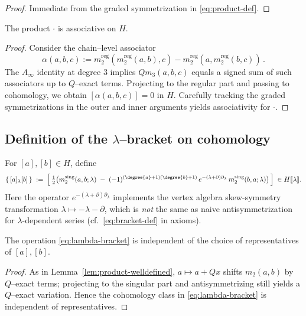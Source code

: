 \begin{proof}
Immediate from the graded symmetrization in \eqref{eq:product-def}.
\end{proof}

\begin{proposition}[Associativity on $H$]%
The product $\cdot$ is associative on $H$.
\end{proposition}

\begin{proof}
Consider the chain–level associator
\[
\alpha(a,b,c) := m_2^{\mathrm{reg}}(m_2^{\mathrm{reg}}(a,b),c) - m_2^{\mathrm{reg}}(a, m_2^{\mathrm{reg}}(b,c))\, .
\]
The $A_\infty$ identity at degree $3$ implies $Qm_3(a,b,c)$ equals a signed sum of such associators up to $Q$–exact terms. Projecting to the regular part and passing to cohomology, we obtain $[\alpha(a,b,c)]=0$ in $H$. Carefully tracking the graded symmetrizations in the outer and inner arguments yields associativity for $\cdot$.
\end{proof}
\subsection{Definition of the $\lambda$–bracket on cohomology}
\begin{definition}%
For $[a],[b]\in H$, define
\begin{equation}%
\{\, [a] {}_\lambda [b] \,\} \;:=\; \Big[\, \tfrac{1}{2}\big( m_2^{\mathrm{sing}}(a,b;\lambda) \;-\; (-1)^{(\degree{a}+1)(\degree{b}+1)}\, e^{-(\lambda+\partial)\partial_\lambda}\, m_2^{\mathrm{sing}}(b,a;\lambda)\big)\,\Big] \;\in H[\![\lambda]\!].
\end{equation}
Here the operator $e^{-(\lambda+\partial)\partial_\lambda}$ implements the vertex algebra skew-symmetry transformation $\lambda\mapsto -\lambda-\partial$, which is \emph{not} the same as naive antisymmetrization for $\lambda$-dependent series (cf.\ \eqref{eq:bracket-def} in axioms).
\end{definition}
\begin{lemma}%
The operation \eqref{eq:lambda-bracket} is independent of the choice of representatives of $[a],[b]$.
\end{lemma}
\begin{proof}
As in Lemma~\ref{lem:product-welldefined}, $a\mapsto a+Qx$ shifts $m_2(a,b)$ by $Q$–exact terms; projecting to the singular part and antisymmetrizing still yields a $Q$–exact variation. Hence the cohomology class in \eqref{eq:lambda-bracket} is independent of representatives.
\end{proof}

